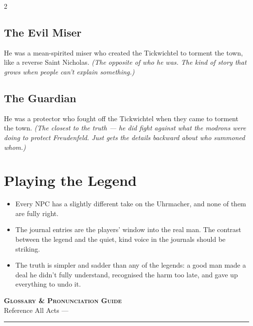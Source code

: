 \documentclass[10pt,letterpaper]{article}
\newcommand{\sceneheader}[4]{%
  \fancyhead[L]{\small\textcolor{accent}{\scshape #1}}%
  \fancyhead[R]{\small\textcolor{accent}{#2 \quad \textbullet \quad #3}}%
  \begin{center}
  {\LARGE\bfseries\scshape\textcolor{accent}{#1}}\\[2pt]
  {\small #2 \quad \textbullet \quad #3 \quad \textbullet \quad #4}\\[2pt]
  \textcolor{rulecol}{\rule{0.5\textwidth}{0.8pt}}
  \end{center}
  \vspace{-4pt}
}
\begin{document}
\begin{multicols}{2}
\subsection*{The Evil Miser}
He was a mean-spirited miser who created the Tickwichtel to torment the town, like a reverse Saint Nicholas. \textit{(The opposite of who he was. The kind of story that grows when people can't explain something.)}

\subsection*{The Guardian}
He was a protector who fought off the Tickwichtel when they came to torment the town. \textit{(The closest to the truth --- he did fight against what the modrons were doing to protect Freudenfeld. Just gets the details backward about who summoned whom.)}

\section*{Playing the Legend}
\begin{itemize}
\item Every NPC has a slightly different take on the Uhrmacher, and none of them are fully right.
\item The journal entries are the players' window into the real man. The contrast between the legend and the quiet, kind voice in the journals should be striking.
\item The truth is simpler and sadder than any of the legends: a good man made a deal he didn't fully understand, recognised the harm too late, and gave up everything to undo it.
\end{itemize}

\end{multicols}

\newpage


\label{sec:glossary}\sceneheader{Glossary \& Pronunciation Guide}{Reference}{All Acts}{---}
\end{document}
